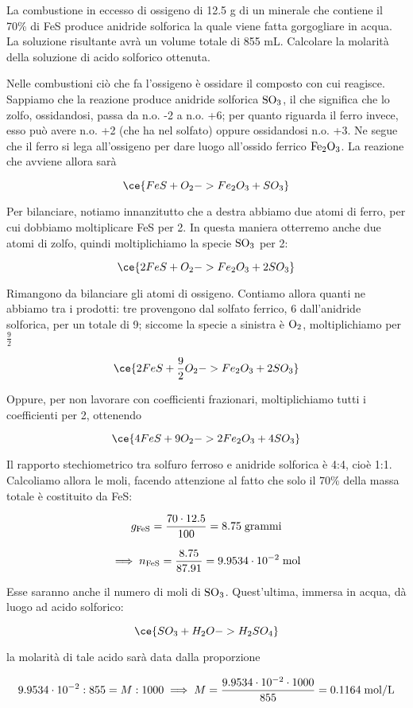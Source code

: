 \begin{esercizio}
    La combustione in eccesso di ossigeno di 12.5 g di un minerale che contiene il 70\% di FeS produce anidride solforica la quale viene fatta gorgogliare in acqua. La soluzione risultante avrà un volume totale di 855 mL. Calcolare la molarità della soluzione di acido solforico ottenuta.
\end{esercizio}
\begin{soluzione}
    Nelle combustioni ciò che fa l'ossigeno è ossidare il composto con cui reagisce. Sappiamo che la reazione produce anidride solforica $\rm SO_3$, il che significa che lo zolfo, ossidandosi, passa da n.o. -2 a n.o. +6; per quanto riguarda il ferro invece, esso può avere n.o. +2 (che ha nel solfato) oppure ossidandosi n.o. +3. Ne segue che il ferro si lega all'ossigeno per dare luogo all'ossido ferrico $\rm Fe_2O_3$. La reazione che avviene allora sarà

$$\ce{FeS + O_2 -> Fe_2O_3 + SO_3}$$

Per bilanciare, notiamo innanzitutto che a destra abbiamo due atomi di ferro, per cui dobbiamo moltiplicare FeS per 2. In questa maniera otterremo anche due atomi di zolfo, quindi moltiplichiamo la specie $\rm SO_3$ per 2:

$$\ce{2FeS + O_2 -> Fe_2O_3 + 2SO_3}$$

Rimangono da bilanciare gli atomi di ossigeno. Contiamo allora quanti ne abbiamo tra i prodotti: tre provengono dal solfato ferrico, 6 dall'anidride solforica, per un totale di 9; siccome la specie a sinistra è $\rm O_2$, moltiplichiamo per $\frac{9}{2}$

$$\ce{2FeS + \frac{9}{2}O_2 -> Fe_2O_3 + 2SO_3}$$

Oppure, per non lavorare con coefficienti frazionari, moltiplichiamo tutti i coefficienti per 2, ottenendo

$$\ce{4FeS + 9O_2 -> 2Fe_2O_3 + 4SO_3}$$

Il rapporto stechiometrico tra solfuro ferroso e anidride solforica è 4:4, cioè 1:1. Calcoliamo allora le moli, facendo attenzione al fatto che solo il 70\% della massa totale è costituito da FeS:

$$g_{\rm FeS}=\frac{70 \cdot 12.5}{100}=8.75 \; \rm grammi$$

$$\implies
n_{\rm FeS}=\frac{8.75}{87.91}=9.9534 \cdot 10^{-2} \; \rm mol$$

Esse saranno anche il numero di moli di $\rm SO_3$. Quest'ultima, immersa in acqua, dà luogo ad acido solforico:

$$\ce{SO_3 + H_2O -> H_2SO_4}$$

la molarità di tale acido sarà data dalla proporzione

$$9.9534 \cdot 10^{-2}:855=M:1000
\implies
M=\frac{9.9534 \cdot 10^{-2} \cdot 1000}{855}=0.1164 \; \rm mol/L$$

\end{soluzione}

